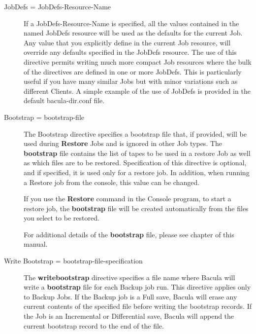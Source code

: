\begin{description}
\item [JobDefs = \lt{}JobDefs-Resource-Name\gt{}]
   If a JobDefs-Resource-Name is specified, all the values contained in the
   named JobDefs resource will be used as the defaults for the current Job.
   Any value that you explicitly define in the current Job resource, will
   override any defaults specified in the JobDefs resource.  The use of
   this directive permits writing much more compact Job resources where the
   bulk of the directives are defined in one or more JobDefs.  This is
   particularly useful if you have many similar Jobs but with minor
   variations such as different Clients.  A simple example of the use of
   JobDefs is provided in the default bacula-dir.conf file.

\item [Bootstrap = \lt{}bootstrap-file\gt{}]
   The Bootstrap directive specifies a bootstrap file that, if provided,
   will be used during {\bf Restore} Jobs and is ignored in other Job
   types.  The {\bf bootstrap} file contains the list of tapes to be used
   in a restore Job as well as which files are to be restored.
   Specification of this directive is optional, and if specified, it is
   used only for a restore job.  In addition, when running a Restore job
   from the console, this value can be changed.

   If you use the {\bf Restore} command in the Console program, to start a
   restore job, the {\bf bootstrap} file will be created automatically from
   the files you select to be restored.

   For additional details of the {\bf bootstrap} file, please see
    chapter
   of this manual.

\label{writebootstrap}
\item [Write Bootstrap =  \lt{}bootstrap-file-specification\gt{}]
   The {\bf writebootstrap} directive specifies a file name where Bacula
   will write a {\bf bootstrap} file for each Backup job run.  This
   directive applies only to Backup Jobs.  If the Backup job is a Full
   save, Bacula will erase any current contents of the specified file
   before writing the bootstrap records.  If the Job is an Incremental
   or Differential
   save, Bacula will append the current bootstrap record to the end of the
   file.


\end{description}
